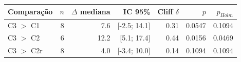 \begin{tabular}{lrrrrrr}
\toprule
Comparação & $n$ & $\Delta$ mediana & IC 95\% & Cliff $\delta$ & $p$ & $p_{Holm}$ \\
\midrule
C3 $>$ C1 & 8 & 7.6 & [-2.5; 14.1] & 0.31 & 0.0547 & 0.1094 \\
C3 $>$ C2 & 6 & 12.2 & [5.1; 17.4] & 0.44 & 0.0156 & 0.0469 \\
C3 $>$ C2r & 8 & 4.0 & [-3.4; 10.0] & 0.14 & 0.1094 & 0.1094 \\
\bottomrule
\end{tabular}
